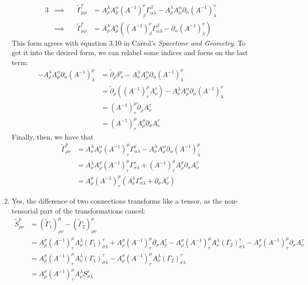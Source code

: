 \documentclass[12pt]{article}
\newcommand{\chrissym}[3]{\Gamma_{#2#3}^#1}
\newcommand{\tchrissym}[3]{\tilde{\Gamma}_{#2#3}^#1}
\begin{document}
\begin{enumerate}[label=(\alph*)]
\begin{alignat*}{3}
        &\implies \quad & \tchrissym{\nu}{\mu}{\rho} &= A_\rho^\lambda A_\mu^\alpha (A^{-1})_\beta^\nu\chrissym{\beta}{\alpha}{\lambda} - A_\rho^\lambda A_\mu^\alpha\partial_\alpha(A^{-1})_\lambda^\nu \\
        &\implies \quad & \tchrissym{\nu}{\mu}{\rho} &= A_\rho^\lambda A_\mu^\alpha \left((A^{-1})_\beta^\nu\chrissym{\beta}{\alpha}{\lambda} -\partial_\alpha(A^{-1})_\lambda^\nu\right)
    \end{alignat*}
    This form agrees with equation 3.10 in Carrol's \textit{Spacetime and Geometry}. To get it into the desired form, we can relabel some indices and focus on the last term:
    \begin{align*}
        -A_\rho^\lambda A_\mu^\alpha \partial_\alpha (A^{-1})_\lambda^\mu &= \tilde{\partial}_\rho\delta_{\;\nu}^\mu - A_\nu^\lambda A_\rho^\alpha \partial_\alpha(A^{-1})_\lambda^\nu \\
        &=  \tilde{\partial}_\rho\left((A^{-1})_\tau^\mu A_\nu^\tau\right) - A_\nu^\lambda A_\rho^\alpha \partial_\alpha(A^{-1})_\lambda^\nu \\
        &= (A^{-1})_\tau^\mu\tilde{\partial}_\rho A_\nu^\tau \\
        &= (A^{-1})_\tau^\mu A_\rho^\sigma \partial_\sigma A_\nu^\tau
    \end{align*}
    Finally, then, we have that
    \begin{align*}
        \tchrissym{\mu}{\rho}{\nu} &= A_\nu^\lambda A_\rho^\alpha (A^{-1})_\tau^\mu\chrissym{\tau}{\alpha}{\lambda} - A_\nu^\lambda A_\rho^\alpha\partial_\alpha(A^{-1})_\lambda^\mu \\
        &= A_\nu^\lambda A_\rho^\sigma (A^{-1})_\tau^\mu\chrissym{\tau}{\sigma}{\lambda} + (A^{-1})_\tau^\mu A_\rho^\sigma \partial_\sigma A_\nu^\tau \\
        &= A_\rho^\sigma (A^{-1})_\tau^\mu\left(A_\nu^\lambda \chrissym{\tau}{\sigma}{\lambda} + \partial_\sigma A_\nu^\tau\right)
    \end{align*}

    \item Yes, the difference of two connections transforms like a tensor, as the non-tensorial part of the transformations cancel:
    \begin{align*}
        \tilde{S}_{\rho\nu}^\mu &= (\tilde{\Gamma}_1)_{\rho\nu}^\mu - (\tilde{\Gamma}_2)_{\rho\nu}^\mu \\
        &= A_\rho^\sigma (A^{-1})_\tau^\mu A_\nu^\lambda (\Gamma_1)_{\sigma\lambda}^\tau + A_\rho^\sigma (A^{-1})_\tau^\mu \partial_\sigma A_\nu^\tau - A_\rho^\sigma (A^{-1})_\tau^\mu A_\nu^\lambda (\Gamma_2)_{\sigma\lambda}^\tau - A_\rho^\sigma (A^{-1})_\tau^\mu \partial_\sigma A_\nu^\tau \\
        &= A_\rho^\sigma (A^{-1})_\tau^\mu A_\nu^\lambda (\Gamma_1)_{\sigma\lambda}^\tau - A_\rho^\sigma (A^{-1})_\tau^\mu A_\nu^\lambda (\Gamma_2)_{\sigma\lambda}^\tau \\
        &= A_\rho^\sigma (A^{-1})_\tau^\mu A_\nu^\lambda S_{\sigma\lambda}^\tau
    \end{align*}
\end{enumerate}
\end{document}
